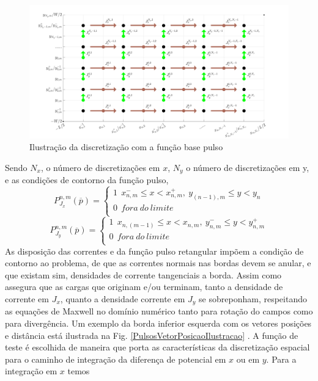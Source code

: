 \documentclass[
	12pt,				%
	openright,			%
	oneside,			%
	a4papey79r,			%
	english,			%
	brazil				%
	]{abntex2}
\begin{document}
\begin{figure}[htb]
 \label{DiscretizaçãoXY}


    \centering
    \caption{Ilustração da discretização  com a função base pulso} \label{fig_minipage}
    \includegraphics[width=\textwidth]{figures/DiscretizacaoXY.png}
  \hfill

\end{figure}
Sendo $N_x$, o número de discretizações em $x$, $N_y$ o número de discretizações em y, e as condições de contorno da função pulso,
\begin{equation}
     P_{J_x}^{n,m}(\overline{p})=  
     \begin{cases}
      1 \ \ x_{n,m}^{-} \leq x < x_{n,m}^{+},\ y_{(n-1),m} \leq y < y_{n}\\
      0 \ \ fora \ do \ limite \\
    \end{cases}  
\end{equation}
\begin{equation}
     P_{J_y}^{n,m}(\overline{p})=  
     \begin{cases}
      1 \ \  x_{n,(m-1)} \leq x < x_{n,m}, \ y_{n,m}^{-} \leq y < y_{n,m}^{+} \\
      0 \ \ fora \ do \ limite \\
    \end{cases}  
\end{equation}
As disposição das correntes e da função pulso retangular impõem a condição de contorno ao problema, de que as correntes normais nas bordas devem se anular, e que existam sim, densidades de corrente tangenciais a borda. Assim como assegura que as cargas que originam e/ou terminam, tanto a densidade de corrente em $J_x$, quanto a densidade corrente em $J_y$ se sobreponham, respeitando as equações de Maxwell no domínio numérico tanto para rotação do campos como para divergência. Um exemplo da borda inferior esquerda com os vetores posições e distância está ilustrada na Fig. \ref{PulsosVetorPosicaoIlustracao} . A função de teste é escolhida de maneira que porta as características da discretização espacial para o caminho de integração da diferença de potencial em $x$ ou em $y$.  Para a integração em $x$ temos
\end{document}
